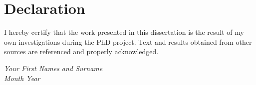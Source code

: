 \chapter*{Declaration}

I hereby certify that the work presented in this dissertation is the result of my own investigations during the PhD project. 
Text and results obtained from other sources are referenced and properly acknowledged.

\begin{flushright}
\it Your First Names and Surname\\
Month Year
\end{flushright}

